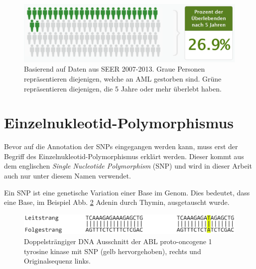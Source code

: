 \begin{figure}
    \centering
    \includegraphics[width=.95\textwidth]{images/SEER_survival_rate_AML.png}
    \caption{Basierend auf Daten aus SEER 2007-2013. Graue Personen repräsentieren diejenigen, welche an \ac{AML} gestorben sind. Grüne repräsentieren diejenigen, die 5 Jahre oder mehr überlebt haben\protect\footnotemark{}.}
    \label{fig:seer_aml_rate}
\end{figure}



\section{Einzelnukleotid-Polymorphismus}
\label{sec:snp_exp}

Bevor auf die Annotation der \ac{SNP}s eingegangen werden kann, muss erst der Begriff des Einzelnukleotid-Polymorphismus erklärt werden. Dieser kommt aus dem englischen \emph{Single Nucleotide Polymorphism} (SNP) und wird in dieser Arbeit auch nur unter diesem Namen verwendet.

Ein \ac{SNP} ist eine genetische Variation einer Base im Genom. Dies bedeutet, dass eine Base, im Beispiel Abb. \ref{fig:snp} Adenin durch Thymin, ausgetauscht wurde.

\begin{figure}[H]
    \centering
    \includegraphics[width=.95\textwidth]{images/DNA_ds_strand_with_snp.png}
    \caption{Doppelsträngiger DNA Ausschnitt der ABL proto-oncogene 1 tyrosine kinase mit \ac{SNP} (gelb hervorgehoben), rechts und Originalsequenz links.}
    \label{fig:snp}
\end{figure}



